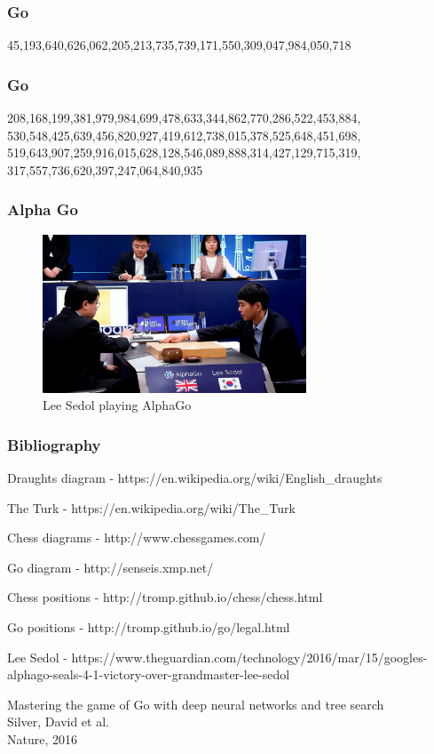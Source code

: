 \documentclass{beamer}
\begin{document}
\begin{frame} %
\frametitle{Go}
45,193,640,626,062,205,213,735,739,171,550,309,047,984,050,718 \cite{chesspositions}
\end{frame}

\begin{frame} %
\frametitle{Go}
208,168,199,381,979,984,699,478,633,344,862,770,286,522,453,884,\\
530,548,425,639,456,820,927,419,612,738,015,378,525,648,451,698,\\
519,643,907,259,916,015,628,128,546,089,888,314,427,129,715,319,\\
317,557,736,620,397,247,064,840,935 \cite{gopositions}
\end{frame}

\begin{frame} %
\frametitle{Alpha Go}
\begin{figure}
	\centering
	\includegraphics[width=0.7\textwidth]{images/alphagomatch.jpg}
	\caption{Lee Sedol playing AlphaGo \cite{leesedol}}
	\label{alphagomatch}
\end{figure}
\end{frame}

\begin{frame} %
\frametitle{Bibliography}
\begin{thebibliography}{9}
	Draughts diagram - https://en.wikipedia.org/wiki/English\_draughts

	The Turk - https://en.wikipedia.org/wiki/The\_Turk

	Chess diagrams - http://www.chessgames.com/

	Go diagram - http://senseis.xmp.net/

	Chess positions - http://tromp.github.io/chess/chess.html

	Go positions - http://tromp.github.io/go/legal.html

	Lee Sedol - https://www.theguardian.com/technology/2016/mar/15/googles-alphago-seals-4-1-victory-over-grandmaster-lee-sedol

	Mastering the game of Go with deep neural networks and tree search\\
	Silver, David et al.\\
	Nature, 2016
\end{thebibliography}
\end{frame}
\end{document}
